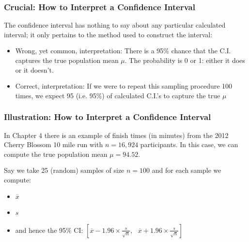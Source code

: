 \documentclass[slides]{beamer}
\newcommand{\blue}[1]{\textcolor{blue2}{#1}}
\newcommand{\xbar}{\overline{x}}
\begin{document}
\begin{frame}
\frametitle{Crucial: How to Interpret a Confidence Interval}
The confidence interval has nothing to say about any particular calculated interval; it only pertains to the \blue{method} used to construct the interval:
\vskip 0.25cm
\begin{itemize}
\pause \item\blue{Wrong, yet common, interpretation}:  There is a 95\% chance that the C.I. captures the true population mean $\mu$.  The probability is 0 or 1: either it does or it doesn't.  
\pause \item\blue{Correct, interpretation}:  If we were to repeat this sampling procedure 100 times, we expect 95 (i.e. 95\%) of calculated C.I.'s to capture the true $\mu$
\end{itemize}
 
\end{frame}


\begin{frame}
\frametitle{Illustration:  How to Interpret a Confidence Interval}
In Chapter 4 there is an example of finish times (in minutes) from the 2012 Cherry Blossom 10 mile run with $n=16,924$ participants.  In this case, we can compute the \blue{true} population mean $\mu=94.52$.

\vspace{0.5cm}

\pause Say we take 25 (random) samples of size $n=100$ and for each sample we compute:
\begin{itemize}
\item $\xbar$
\item $s$
\item and hence the 95\% CI:  $\left[
\overline{x} - 1.96 \times\frac{s}{\sqrt n}, \mbox{  }
\overline{x} + 1.96 \times\frac{s}{\sqrt n}
\right]$
\end{itemize}
\end{frame}
\end{document}
